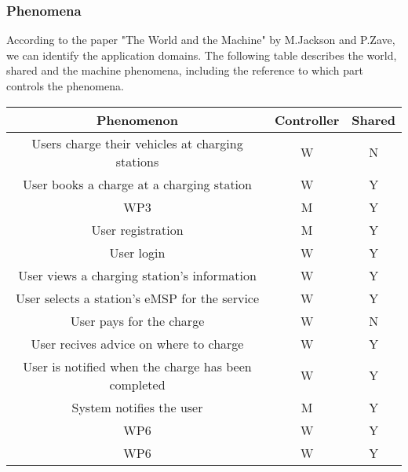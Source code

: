 \subsubsection{Phenomena}
According to the paper "The World and the Machine" by M.Jackson and P.Zave, 
we can identify the application domains. 
The following table describes the world, shared and the machine phenomena, 
including the reference to which part controls the phenomena.
\begin{table}[h]
        \centering
        \begin{tabular}{|c|c|c|}
        \hline
        \textbf{Phenomenon}                                        & \textbf{Controller} & \textbf{Shared} \\ \hline
        Users charge their vehicles at charging stations  & W          & N      \\ \hline
        User books a charge at a charging station         & W          & Y      \\ \hline
        WP3                                               & M          & Y      \\ \hline
        User registration                                 & M          & Y      \\ \hline
        User login                                        & W          & Y      \\ \hline
        User views a charging station's information       & W          & Y      \\ \hline
        User selects a station's eMSP for the service     & W          & Y      \\ \hline
        User pays for the charge                          & W          & N      \\ \hline
        User recives advice on where to charge            & W          & Y      \\ \hline
        User is notified when the charge has been completed   & W          & Y      \\ \hline
        System notifies the user                          & M          & Y      \\ \hline
        WP6                                               & W          & Y      \\ \hline
        WP6                                               & W          & Y      \\ \hline
        \end{tabular}
\end{table}

